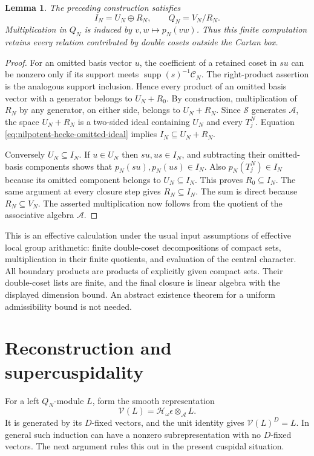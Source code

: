 \documentclass[10pt,letterpaper]{amsart}
\numberwithin{equation}{section}
\newtheorem{lemma}[theorem]{Lemma}
\theoremstyle{remark}
\begin{document}
\begin{lemma}\label{lem:nilpotent-hecke-boundary-closure}
The preceding construction satisfies
\[
 I_N=U_N\oplus R_N,\qquad Q_N=V_N/R_N.
\]
Multiplication in $Q_N$ is induced by $v,w\mapsto p_N(vw)$.
Thus this finite computation retains every relation contributed by double
cosets outside the Cartan box.
\end{lemma}

\begin{proof}
For an omitted basis vector $u$, the coefficient of a retained coset in
$su$ can be nonzero only if its support meets
$\operatorname{supp}(s)^{-1}\mathcal C_N$. The right-product assertion is
the analogous support inclusion. Hence every product of an omitted basis
vector with a generator belongs to $U_N+R_0$. By construction, multiplication
of $R_N$ by any generator, on either side, belongs to $U_N+R_N$.
Since $\mathcal S$ generates $\mathcal A$, the space $U_N+R_N$ is a
two-sided ideal containing $U_N$ and every $T_j^N$. Equation
\eqref{eq:nilpotent-hecke-omitted-ideal} implies $I_N\subseteq U_N+R_N$.

Conversely $U_N\subseteq I_N$. If $u\in U_N$ then $su,us\in I_N$,
and subtracting their omitted-basis components shows that
$p_N(su),p_N(us)\in I_N$. Also $p_N(T_j^N)\in I_N$ because its omitted
component belongs to $U_N\subseteq I_N$. This proves $R_0\subseteq I_N$.
The same argument at every closure step gives $R_N\subseteq I_N$.
The sum is direct because $R_N\subseteq V_N$. The asserted multiplication
now follows from the quotient of the associative algebra $\mathcal A$.
\end{proof}

This is an effective calculation under the usual input assumptions of
effective local group arithmetic: finite double-coset decompositions of
compact sets, multiplication in their finite quotients, and evaluation of
the central character. All boundary products are products of explicitly
given compact sets. Their double-coset lists are finite, and the final
closure is linear algebra with the displayed dimension bound. An abstract
existence theorem for a uniform admissibility bound is not needed.


\section{Reconstruction and supercuspidality}
\label{sec:reconstruction}


For a left $Q_N$-module $L$, form the smooth representation
\[
 \mathcal V(L)=\mathcal H_\omega\epsilon\otimes_{\mathcal A}L.
\]
It is generated by its $D$-fixed vectors, and the unit identity gives
$\mathcal V(L)^D=L$. In general such induction can have a nonzero
subrepresentation with no $D$-fixed vectors. The next argument rules this
out in the present cuspidal situation.
\end{document}
